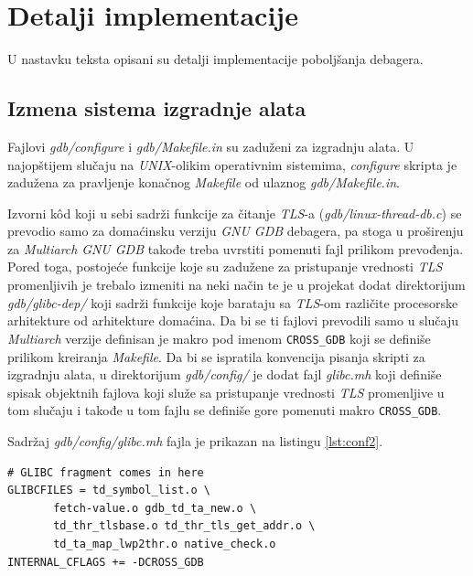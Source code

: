 \documentclass[12pt,oneside]{memoir}
\begin{document}
\section{Detalji implementacije}

U nastavku teksta opisani su detalji implementacije poboljšanja debagera.

\subsection{Izmena sistema izgradnje alata}

Fajlovi \emph{gdb/configure} i \emph{gdb/Makefile.in} su zaduženi za izgradnju alata. U najopštijem slučaju na \emph{UNIX}-olikim operativnim sistemima, \emph{configure} skripta je zadužena za pravljenje konačnog \emph{Makefile} od ulaznog \emph{gdb/Makefile.in}.

Izvorni k\^{o}d koji u sebi sadrži funkcije za čitanje \emph{TLS}-a (\emph{gdb/linux-thread-db.c}) se prevodio samo za domaćinsku verziju \emph{GNU GDB} debagera, pa stoga u proširenju za \emph{Multiarch} \emph{GNU GDB} takođe treba uvrstiti pomenuti fajl prilikom prevođenja. Pored toga, postojeće funkcije koje su zadužene za pristupanje vrednosti \emph{TLS} promenljivih je trebalo izmeniti na neki način te je u projekat dodat direktorijum \emph{gdb/glibc-dep/} koji sadrži funkcije koje barataju sa \emph{TLS}-om različite procesorske arhitekture od arhitekture domaćina. Da bi se ti fajlovi prevodili samo u slučaju \emph{Multiarch} verzije definisan je makro pod imenom \texttt{CROSS\_GDB} koji se definiše prilikom kreiranja \emph{Makefile}. Da bi se ispratila konvencija pisanja skripti za izgradnju alata, u direktorijum \emph{gdb/config/} je dodat fajl \emph{glibc.mh} koji definiše spisak objektnih fajlova koji služe sa pristupanje vrednosti \emph{TLS} promenljive u tom slučaju i takođe u tom fajlu se definiše gore pomenuti makro \texttt{CROSS\_GDB}.

Sadržaj \emph{gdb/config/glibc.mh} fajla je prikazan na listingu \ref{lst:conf2}.
\begin{lstlisting}[label={lst:conf2}, caption={Sadržaj \emph{gdb/config/glibc.mh} fajla.}]
# GLIBC fragment comes in here
GLIBCFILES = td_symbol_list.o \
       fetch-value.o gdb_td_ta_new.o \
       td_thr_tlsbase.o td_thr_tls_get_addr.o \
       td_ta_map_lwp2thr.o native_check.o
INTERNAL_CFLAGS += -DCROSS_GDB
\end{lstlisting}
\end{document}
